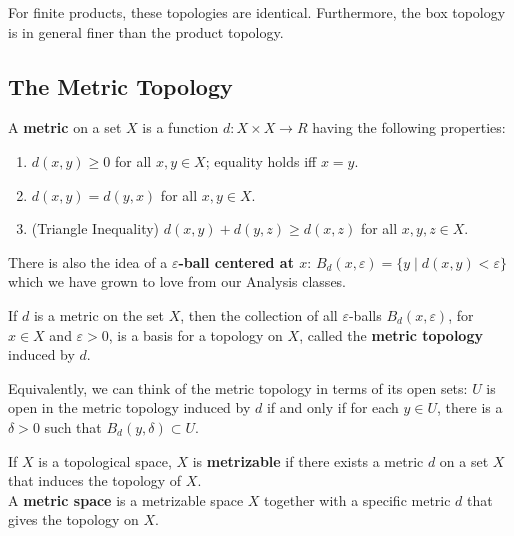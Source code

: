\begin{remark}
For finite products, these topologies are identical. Furthermore, the box topology is in general finer than the product topology.
\end{remark}

\subsection{The Metric Topology}

\begin{definition}[Metric]
A \textbf{metric} on a set $X$ is a function $d \colon X \times X \rightarrow R$ having the following properties:
\begin{enumerate}
    \item $d(x, y) \geq 0$ for all $x, y \in X$; equality holds iff $x =y$.
    \item $d(x, y) = d(y, x)$ for all $x,y \in X$.
    \item (Triangle Inequality) $d(x, y) + d(y, z) \geq d(x, z)$ for all $x, y, z \in X$.
\end{enumerate}

\end{definition}

There is also the idea of a \textbf{$\varepsilon$-ball centered at $x$}: $B_d(x, \varepsilon) = \{ y \mid d(x, y) < \varepsilon \}$
which we have grown to love from our Analysis classes. \\

\begin{definition}
If $d$ is a metric on the set $X$, then the collection of all $\varepsilon$-balls $B_d(x, \varepsilon)$, for $x \in X$ and $\varepsilon > 0$, is a basis for a topology on $X$,
called the \textbf{metric topology} induced by $d$.
\end{definition}

\begin{remark}
Equivalently, we can think of the metric topology in terms of its open sets:
$U$ is open in the metric topology induced by $d$ if and only if for each $y \in U$, there is a $\delta > 0$ such that $B_d(y, \delta) \subset U$.
\end{remark}

\begin{definition}
If $X$ is a topological space, $X$ is \textbf{metrizable} if there exists a metric $d$ on a set $X$ that induces the topology of $X$. \\

A \textbf{metric space} is a metrizable space $X$ together with a specific metric $d$ that gives the topology on $X$.
\end{definition}

